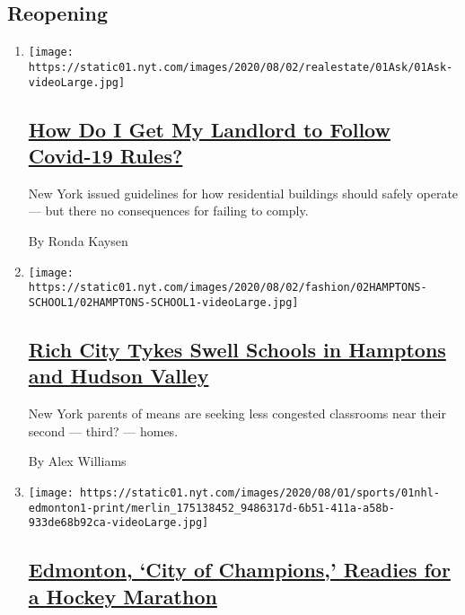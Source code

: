 \hypertarget{reopening}{%
\subsection{Reopening}\label{reopening}}

\begin{enumerate}
\def\labelenumi{\arabic{enumi}.}
\item
  \texttt{[image: https://static01.nyt.com/images/2020/08/02/realestate/01Ask/01Ask-videoLarge.jpg]}

  \hypertarget{how-do-i-get-my-landlord-to-follow-covid-19-rules}{%
  \subsection{\texorpdfstring{\href{/2020/08/01/realestate/coronavirus-covid-apartment-buildings.html}{How
  Do I Get My Landlord to Follow Covid-19
  Rules?}}{How Do I Get My Landlord to Follow Covid-19 Rules?}}\label{how-do-i-get-my-landlord-to-follow-covid-19-rules}}

  New York issued guidelines for how residential buildings should safely
  operate --- but there no consequences for failing to comply.

  By Ronda Kaysen
\item
  \texttt{[image: https://static01.nyt.com/images/2020/08/02/fashion/02HAMPTONS-SCHOOL1/02HAMPTONS-SCHOOL1-videoLarge.jpg]}

  \hypertarget{rich-city-tykes-swell-schools-in-hamptons-and-hudson-valley}{%
  \subsection{\texorpdfstring{\href{/2020/08/01/style/wealthy-rich-parents-coronavirus-schools-hamptons.html}{Rich
  City Tykes Swell Schools in Hamptons and Hudson
  Valley}}{Rich City Tykes Swell Schools in Hamptons and Hudson Valley}}\label{rich-city-tykes-swell-schools-in-hamptons-and-hudson-valley}}

  New York parents of means are seeking less congested classrooms near
  their second --- third? --- homes.

  By Alex Williams
\item
  \texttt{[image: https://static01.nyt.com/images/2020/08/01/sports/01nhl-edmonton1-print/merlin\_175138452\_9486317d-6b51-411a-a58b-933de68b92ca-videoLarge.jpg]}

  \hypertarget{edmonton-city-of-champions-readies-for-a-hockey-marathon}{%
  \subsection{\texorpdfstring{\href{/2020/08/01/sports/hockey/edmonton-nhl-playoffs.html}{Edmonton,
  `City of Champions,' Readies for a Hockey
  Marathon}}{Edmonton, `City of Champions,' Readies for a Hockey Marathon}}\label{edmonton-city-of-champions-readies-for-a-hockey-marathon}}


\end{enumerate}
